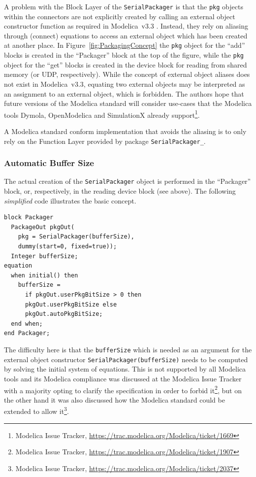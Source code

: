 \documentclass{resources/modelica}
\newcommand{\modelica}[1]{\lstinline[language=modelica]|#1|}
\begin{document}
A problem with the \textsf{Block Layer} of the \modelica{SerialPackager} is that the \modelica{pkg}
objects within the connectors are not explicitly created by calling an external object constructor
function as required in Modelica~v3.3 \cite[p.\@~165]{ModelicaAssociation2014}.
Instead, they rely on aliasing through (connect) equations to
access an external object which has been created at another place. In
Figure~\ref{fig:PackagingConcept} the \modelica{pkg} object for the ``add''
blocks is created in the ``Packager'' block at the top of the figure, while the
\modelica{pkg} object for the ``get'' blocks is created in the device block for reading from
shared memory (or UDP, respectively). While the concept of external object
aliases does not exist in Modelica~v3.3, equating two external
objects may be interpreted as an assignment to an external object,
which is forbidden. The authors hope that future versions of
the Modelica standard will consider use-cases that the
Modelica tools Dymola, OpenModelica and SimulationX already support\footnote{Modelica Issue Tracker,
\url{https://trac.modelica.org/Modelica/ticket/1669}}.

A Modelica standard conform implementation that avoids the aliasing is to only rely on the \textsf{Function Layer} provided by package \modelica{SerialPackager_}.

\subsubsection{Automatic Buffer Size}
\label{sec:Automatic Buffer Size}

The actual creation of the \modelica{SerialPackager} object is performed in
the ``Packager'' block, or, respectively, in the reading device block (see
above). The following \emph{simplified} code illustrates the basic concept.
\begin{lstlisting}[language=modelica]
block Packager
  PackageOut pkgOut(
    pkg = SerialPackager(bufferSize),
    dummy(start=0, fixed=true));
  Integer bufferSize;
equation
  when initial() then
    bufferSize =
      if pkgOut.userPkgBitSize > 0 then
      pkgOut.userPkgBitSize else
      pkgOut.autoPkgBitSize;
  end when;
end Packager;
\end{lstlisting}
The difficulty here is that the \modelica{bufferSize} which is needed as an
argument for the external object constructor
\modelica{SerialPackager(bufferSize)} needs to be computed by solving the
initial system of equations. This is not supported by all Modelica tools and its
Modelica compliance was discussed at the Modelica Issue Tracker with a majority
opting to clarify the specification in order to forbid it\footnote{Modelica Issue Tracker,
\url{https://trac.modelica.org/Modelica/ticket/1907}}, but on the other hand
it was also discussed how the Modelica standard could be extended to allow
it\footnote{Modelica Issue Tracker,
\url{https://trac.modelica.org/Modelica/ticket/2037}}.
\end{document}
